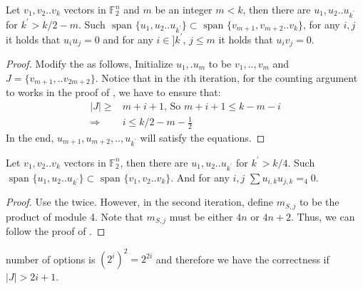 \begin{claim}
  Let $v_{1},v_{2}..v_{k}$ vectors in $\mathbb{F}_{2}^{n}$ and $m$ be an integer
  $m<k$, then there are $u_{1},u_{2}..u_{k^{\prime}}$ for $k^{\prime} > k/2-m$.
  Such $\text{ span } \{   u_{1},u_{2}..u_{k^{\prime}} \} \subset \text{ span }
  \{ v_{m+1},v_{m+2}..v_{k} \}$, for any $i,j$ it holds that $u_{i}u_{j} = 0$
and for any $i\in ]k^{\prime}$, $j\le m$ it holds that $u_{i}v_{j} = 0$.
\end{claim}
\begin{proof}
  Modify the  as follows, Initialize $u_{1},.u_{m}$ to be
  $v_{1},..,v_{m}$ and $J = \{v_{m+1},..v_{2m+2}\}$. Notice that in the $i$th
  iteration, for the counting argument to works in the proof of
  , we have to ensure that:
  \begin{equation*}
    \begin{split}
      |J| \ge &  m+i+1 \text{,  So  } m+i+1\le k - m - i  \\
      \Rightarrow & i \le k/2 -m - \frac{1}{2}
    \end{split}
  \end{equation*}
  In the end, $u_{m+1},u_{m+2},..,u_{k^{\prime}}$ will satisfy the equations.
\end{proof}
\begin{claim}
  Let $v_{1},v_{2}..v_{k}$ vectors in $\mathbb{F}_{2}^{n}$, then there are
  $u_{1},u_{2}..u_{k^{\prime}}$ for $k^{\prime} > k/4$. Such $\text{ span } \{
  u_{1},u_{2}..u_{k^{\prime}} \} \subset \text{ span } \{ v_{1},v_{2}..v_{k}
  \}$. And for any $i,j$ $\sum u_{i,k}u_{j,k} =_{4} 0$.
\end{claim}
\begin{proof}
  Use the  twice. However, in the second iteration, define
  $m_{S,j}$ to be the product of module 4. Note that $m_{S,j}$ must be either
  $4n$ or $4n+2$. Thus, we can follow the proof of .
\end{proof}

\begin{claim}
   number of
  options is $\left(2^{i}\right)^2 = 2^{2i}$ and therefore we have the
  correctness if $|J| > 2i+1$.
\end{claim}

